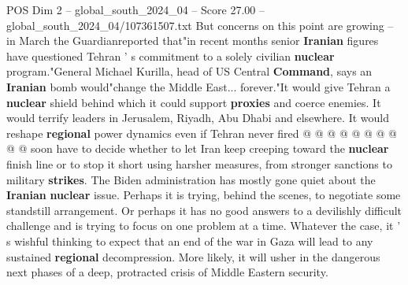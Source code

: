 \begin{textsample}{POS Dim 2 – global\_south\_2024\_04 – Score 27.00 – global\_south\_2024\_04/107361507.txt}
But concerns on this point are growing -- in March the Guardianreported that"in recent months senior \textbf{Iranian} figures have questioned Tehran ' s commitment to a solely civilian \textbf{nuclear} program."General Michael Kurilla, head of US Central \textbf{Command}, says an \textbf{Iranian} bomb would"change the Middle East... forever."It would give Tehran a \textbf{nuclear} shield behind which it could support \textbf{proxies} and coerce enemies.
It would terrify leaders in Jerusalem, Riyadh, Abu Dhabi and elsewhere.
It would reshape \textbf{regional} power dynamics even if Tehran never fired @ @ @ @ @ @ @ @ @ @ soon have to decide whether to let Iran keep creeping toward the \textbf{nuclear} finish line or to stop it short using harsher measures, from stronger sanctions to military \textbf{strikes}.
The Biden administration has mostly gone quiet about the \textbf{Iranian} \textbf{nuclear} issue.
Perhaps it is trying, behind the scenes, to negotiate some standstill arrangement.
Or perhaps it has no good answers to a devilishly difficult challenge and is trying to focus on one problem at a time.
Whatever the case, it ' s wishful thinking to expect that an end of the war in Gaza will lead to any sustained \textbf{regional} decompression.
More likely, it will usher in the dangerous next phases of a deep, protracted crisis of Middle Eastern security.

\end{textsample}
